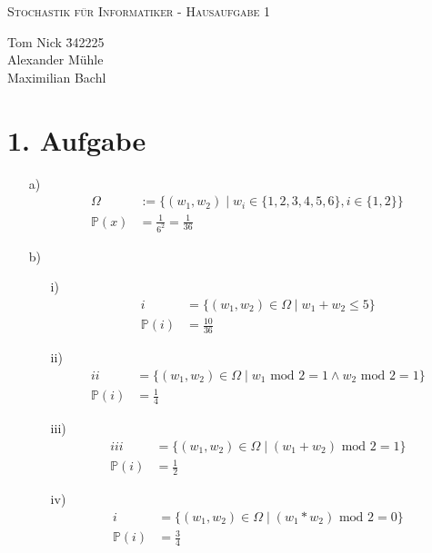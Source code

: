 \documentclass[10pt,a4paper,parskip=half]{scrartcl}
\newcommand{\PP}{\mathbb{P}}
\begin{document}
\begin{center}
\textsc{\Large{Stochastik für Informatiker - Hausaufgabe 1}} \\
\end{center}
\begin{tabbing}
Tom Nick \hspace{1.4cm}\= 342225\\
Alexander Mühle\\
Maximilian Bachl
\end{tabbing}
\section*{1. Aufgabe}
	\begin{enumerate}
		\item[a)] 
			\begin{align*}
				\Omega &:= \{(w_1,w_2) \mid w_i \in \{1,2,3,4,5,6\}, i \in \{1,2\}\} \\
				 \PP(x) &= \frac{1}{6^2} = \frac{1}{36}
			\end{align*}
		\item[b)]
			\begin{enumerate}
				\item[i)] \begin{align*} 
									i &= \{(w_1,w_2) \in \Omega \mid w_1 + w_2 \le 5 \}\\
									\PP(i) &= \frac{10}{36}
							\end{align*}
				\item[ii)] \begin{align*} 
									ii &= \{(w_1,w_2) \in \Omega \mid w_1\text{ mod } 2 = 1 \land w_2\text{ mod } 2 = 1 \}\\
									\PP(i) &= \frac{1}{4}
							\end{align*}
				\item[iii)] \begin{align*} 
									iii &= \{(w_1,w_2) \in \Omega \mid (w_1 + w_2) \text{ mod } 2 = 1\}\\
									\PP(i) &= \frac{1}{2}
							\end{align*}
				\item[iv)] \begin{align*} 
									i &= \{(w_1,w_2) \in \Omega \mid ( w_1 * w_2) \text{ mod } 2 = 0 \}\\
									\PP(i) &= \frac{3}{4}
							\end{align*}
			\end{enumerate}
	\end{enumerate}
\end{document}

